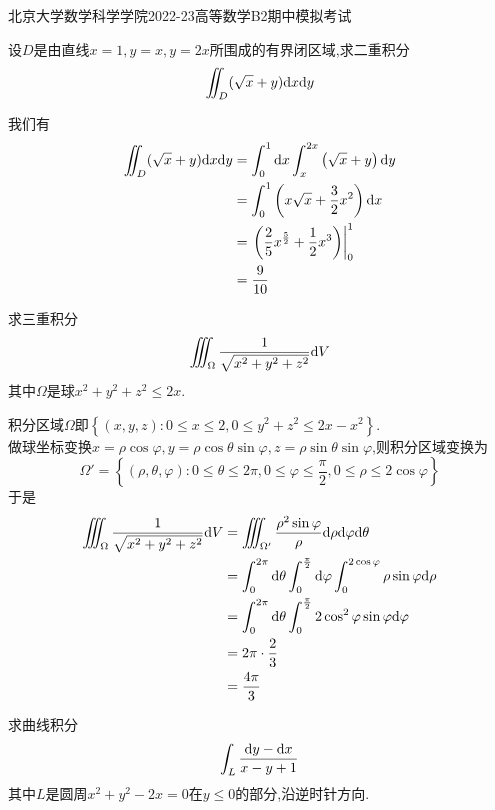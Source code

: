 \documentclass{ctexart}
\begin{document}
\pagestyle{empty}
\begin{center}\Large
    北京大学数学科学学院2022-23高等数学B2期中模拟考试
\end{center}
\begin{problem}[1.(10\songti{分})]
    设$D$是由直线$x=1,y=x,y=2x$所围成的有界闭区域,求二重积分
    \[\iint_D(\sqrt x+y)\mathrm{d} x\mathrm{d} y\]

\end{problem}
\begin{solution}
    我们有
    \[\begin{aligned}
        \iint_D(\sqrt x+y)\mathrm{d} x\mathrm{d} y
        &= \int_0^1\mathrm{d} x\int_x^{2x}\left(\sqrt x+y\right)\mathrm{d} y \\
        &= \int_0^1\left(x\sqrt x+\dfrac32x^2\right)\mathrm{d} x \\
        &= \left.\left(\dfrac25x^{\frac52}+\dfrac12x^3\right)\right|_0^1 \\
        &= \dfrac{9}{10}
    \end{aligned}\]
\end{solution}
\begin{problem}[2.(10\songti{分})]
    求三重积分
    \[\iiint_\Omega\dfrac{1}{\sqrt{x^2+y^2+z^2}}\mathrm{d} V\]
    其中$\Omega$是球$x^2+y^2+z^2\leqslant 2x$.
\end{problem}
\begin{solution}
    积分区域$\Omega$即$\left\{(x,y,z):0\leqslant x\leqslant 2,0\leqslant y^2+z^2\leqslant 2x-x^2\right\}$.\\
    做球坐标变换$x=\rho\cos\varphi,y=\rho\cos\theta\sin\varphi,z=\rho\sin\theta\sin\varphi$,则积分区域变换为
    \[\Omega'=\left\{(\rho,\theta,\varphi):0\leqslant\theta\leqslant2\pi,0\leqslant\varphi\leqslant\dfrac\pi2,0\leqslant\rho\leqslant2\cos\varphi\right\}\]
    于是
    \[\begin{aligned}
        \iiint_\Omega\dfrac{1}{\sqrt{x^2+y^2+z^2}}\mathrm{d} V
        &= \iiint_{\Omega'}\dfrac{\rho^2\sin\varphi}{\rho}\mathrm{d}\rho\mathrm{d}\varphi\mathrm{d}\theta \\
        &= \int_0^{2\pi}\mathrm{d}\theta\int_0^{\frac\pi2}\mathrm{d}\varphi\int_0^{2\cos\varphi}\rho\sin\varphi\mathrm{d}\rho \\
        &= \int_0^{2\pi}\mathrm{d}\theta\int_0^{\frac\pi2}2\cos^2\varphi\sin\varphi\mathrm{d}\varphi \\
        &= 2\pi\cdot\dfrac{2}{3} \\
        &= \dfrac{4\pi}{3}
    \end{aligned}\]
\end{solution}
\begin{problem}[3.(10\songti{分})]
    求曲线积分
    \[\int_L\dfrac{\mathrm{d} y-\mathrm{d} x}{x-y+1}\]
    其中$L$是圆周$x^2+y^2-2x=0$在$y\leqslant 0$的部分,沿逆时针方向.
\end{problem}
\end{document}
